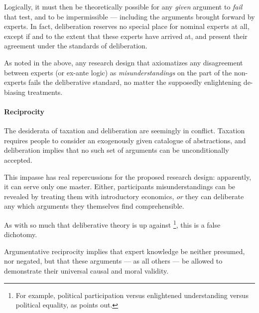 Logically, it must then be theoretically possible for any \emph{given} argument to \emph{fail} that test, and to be impermissible --- including the arguments brought forward by experts.
In fact, deliberation reserves no special place for nominal experts at all, except if and to the extent that these experts have arrived at, and present their agreement under the standards of deliberation.
	
As noted in the above, any research design that axiomatizes any disagreement between experts (or ex-ante logic) as \emph{misunderstandings} on the part of the non-experts fails the deliberative standard, no matter the supposedly enlightening de-biasing treatments.

\paragraph{Reciprocity}
The desiderata of taxation and deliberation are seemingly in conflict.
Taxation requires people to consider an exogenously given catalogue of abstractions, and deliberation implies that no such set of arguments can be unconditionally accepted.

This impasse has real repercussions for the proposed research design: apparently, it can serve only one master.
Either, participants misunderstandings can be revealed by treating them with introductory economics, \emph{or} they can deliberate any which arguments they themselves find comprehensible.

As with so much that deliberative theory is up against
\footnote{
	For example, political participation versus enlightened understanding versus political equality, as \citeauthor{Fishkin2009} points out.
}, %
this is a false dichotomy.

Argumentative reciprocity implies that expert knowledge be neither presumed, nor negated, but that these arguments --- as all others --- be allowed to demonstrate their universal causal and moral validity.


